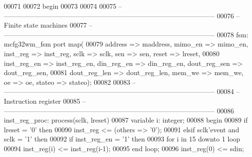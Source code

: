 \begin{DoxyCode}
00071 
00072 \textcolor{vhdlkeyword}{begin}
00073 
00074 
00075 \textcolor{keyword}{   -- ---------------------------------------------------------------------------------------------}
00076 \textcolor{keyword}{   -- Finite state machines}
00077 \textcolor{keyword}{   -- ---------------------------------------------------------------------------------------------}
00078    fsm: mcfg32wm_fsm \textcolor{keywordflow}{port} \textcolor{keywordflow}{map}( 
00079       address => maddress, mimo_en => mimo_en, inst_reg => inst_reg, sclk => 
      sclk, sen => sen, reset => lreset,
00080       inst_reg_en => inst_reg_en, din_reg_en => din_reg_en, dout_reg_sen => 
      dout_reg_sen,
00081       dout_reg_len => dout_reg_len, mem_we => mem_we, oe => oe, stateo => stateo\textcolor{vhdlchar}{)};
00082       
00083 \textcolor{keyword}{   -- ---------------------------------------------------------------------------------------------}
00084 \textcolor{keyword}{   -- Instruction register}
00085 \textcolor{keyword}{   -- ---------------------------------------------------------------------------------------------}
00086    inst\_reg\_proc: \textcolor{keywordflow}{process}(sclk, lreset)
00087       \textcolor{keywordflow}{variable} \textcolor{vhdlchar}{i}\textcolor{vhdlchar}{:} \textcolor{comment}{integer};
00088 \textcolor{vhdlkeyword}{   begin}
00089       \textcolor{keywordflow}{if} \textcolor{vhdlchar}{lreset} \textcolor{vhdlchar}{=} \textcolor{vhdlchar}{'}\textcolor{vhdllogic}{}\textcolor{vhdllogic}{0}\textcolor{vhdlchar}{'} \textcolor{keywordflow}{then}
00090          inst\_reg <= (\textcolor{keywordflow}{others} => '0');
00091       \textcolor{keywordflow}{elsif} \textcolor{vhdlchar}{sclk}\textcolor{vhdlchar}{'}\textcolor{vhdlkeyword}{event} \textcolor{keywordflow}{and} \textcolor{vhdlchar}{sclk} \textcolor{vhdlchar}{=} \textcolor{vhdlchar}{'}\textcolor{vhdllogic}{}\textcolor{vhdllogic}{1}\textcolor{vhdlchar}{'} \textcolor{keywordflow}{then}
00092          \textcolor{keywordflow}{if} \textcolor{vhdlchar}{inst_reg_en} \textcolor{vhdlchar}{=} \textcolor{vhdlchar}{'}\textcolor{vhdllogic}{}\textcolor{vhdllogic}{1}\textcolor{vhdlchar}{'} \textcolor{keywordflow}{then}
00093             \textcolor{keywordflow}{for} \textcolor{vhdlchar}{i} \textcolor{keywordflow}{in} \textcolor{vhdllogic}{}\textcolor{vhdllogic}{15} \textcolor{keywordflow}{downto} \textcolor{vhdllogic}{}\textcolor{vhdllogic}{1} \textcolor{keywordflow}{loop}
00094                inst\_reg(i) <= inst\_reg(i-1);
00095             \textcolor{keywordflow}{end} \textcolor{keywordflow}{loop};
00096             inst\_reg(\textcolor{vhdllogic}{0}) <= sdin;

\end{DoxyCode}
